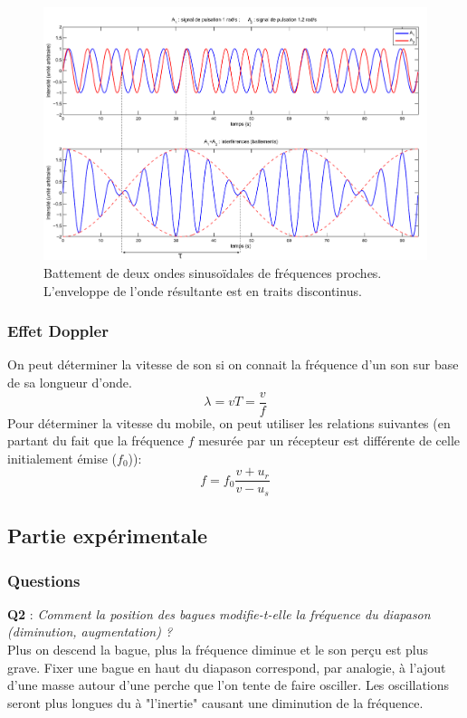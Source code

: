 \documentclass	[11pt, a4paper, openany]{book}
\begin{document}
\begin{figure}[h]
\begin{center}
\includegraphics[scale=0.5]{labo/image1.png}
\end{center}
\caption{Battement de deux ondes sinusoïdales de fréquences proches. L'enveloppe de l'onde résultante est en traits discontinus.}
\label{image0}
\end{figure}

\subsubsection{Effet Doppler}
On peut déterminer la vitesse de son si on connait la fréquence d'un son sur base de sa longueur d'onde.
\begin{equation}
\lambda = vT = \frac{v}{f}
\label{lambda}
\end{equation}
Pour déterminer la vitesse du mobile, on peut utiliser les relations suivantes (en partant du fait que la fréquence $f$ mesurée par un récepteur est différente de celle initialement émise ($f_0$)):
\begin{equation}
f = f_0\frac{v + u_{r}}{v - u_{s}}
\label{doppler}
\end{equation}

\subsection{Partie expérimentale}
\subsubsection{Questions}
\textbf{Q2} : \textit{Comment la position des bagues modifie-t-elle la fréquence du diapason (diminution, augmentation) ?}\\
Plus on descend la bague, plus la fréquence diminue et le son perçu est plus grave. Fixer une bague en haut du diapason correspond, par analogie, à l'ajout d'une masse autour d'une perche que l'on tente de faire osciller. Les oscillations seront plus longues du à "l'inertie" causant une diminution de la fréquence.\\
\end{document}
